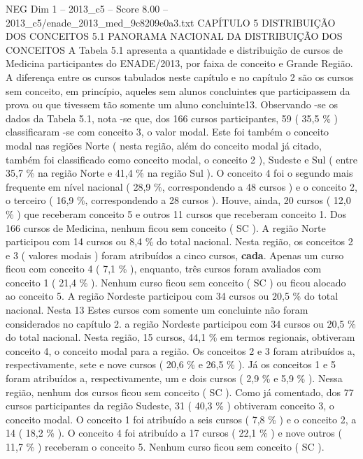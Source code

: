 \begin{textsample}{NEG Dim 1 – 2013\_c5 – Score 8.00 – 2013\_c5/enade\_2013\_med\_9c8209e0a3.txt}  \label{ex:f1_neg_356}
CAPÍTULO 5 DISTRIBUIÇÃO DOS CONCEITOS 5.1 PANORAMA NACIONAL DA DISTRIBUIÇÃO DOS CONCEITOS A Tabela 5.1 apresenta a quantidade e distribuição de cursos de Medicina participantes do ENADE/2013, por faixa de conceito e Grande Região.
A diferença entre os cursos tabulados neste capítulo e no capítulo 2 são os cursos sem conceito, em princípio, aqueles sem alunos concluintes que participassem da prova ou que tivessem tão somente um aluno concluinte13.
Observando -se os dados da Tabela 5.1, nota -se que, dos 166 cursos participantes, 59 ( 35,5 \% ) classificaram -se com conceito 3, o valor modal.
Este foi também o conceito modal nas regiões Norte ( nesta região, além do conceito modal já citado, também foi classificado como conceito modal, o conceito 2 ), Sudeste e Sul ( entre 35,7 \% na região Norte e 41,4 \% na região Sul ).
O conceito 4 foi o segundo mais frequente em nível nacional ( 28,9 \%, correspondendo a 48 cursos ) e o conceito 2, o terceiro ( 16,9 \%, correspondendo a 28 cursos ).
Houve, ainda, 20 cursos ( 12,0 \% ) que receberam conceito 5 e outros 11 cursos que receberam conceito 1.
Dos 166 cursos de Medicina, nenhum ficou sem conceito ( SC ).
A região Norte participou com 14 cursos ou 8,4 \% do total nacional.
Nesta região, os conceitos 2 e 3 ( valores modais ) foram atribuídos a cinco cursos, \textbf{cada}.
Apenas um curso ficou com conceito 4 ( 7,1 \% ), enquanto, três cursos foram avaliados com conceito 1 ( 21,4 \% ).
Nenhum curso ficou sem conceito ( SC ) ou ficou alocado ao conceito 5.
A região Nordeste participou com 34 cursos ou 20,5 \% do total nacional.
Nesta 13 Estes cursos com somente um concluinte não foram considerados no capítulo 2. a região Nordeste participou com 34 cursos ou 20,5 \% do total nacional.
Nesta região, 15 cursos, 44,1 \% em termos regionais, obtiveram conceito 4, o conceito modal para a região.
Os conceitos 2 e 3 foram atribuídos a, respectivamente, sete e nove cursos ( 20,6 \% e 26,5 \% ).
Já os conceitos 1 e 5 foram atribuídos a, respectivamente, um e dois cursos ( 2,9 \% e 5,9 \% ).
Nessa região, nenhum dos cursos ficou sem conceito ( SC ).
Como já comentado, dos 77 cursos participantes da região Sudeste, 31 ( 40,3 \% ) obtiveram conceito 3, o conceito modal.
O conceito 1 foi atribuído a seis cursos ( 7,8 \% ) e o conceito 2, a 14 ( 18,2 \% ).
O conceito 4 foi atribuído a 17 cursos ( 22,1 \% ) e nove outros ( 11,7 \% ) receberam o conceito 5.
Nenhum curso ficou sem conceito ( SC ).

\end{textsample}
